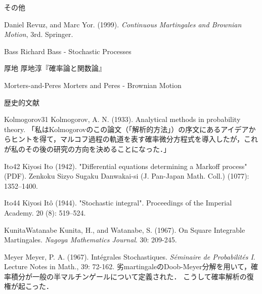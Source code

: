 \documentclass[uplatex,dvipdfmx]{jsreport}
\begin{document}
\begin{thebibliography}{99}
    その他
    \item
    Daniel Revuz, and Marc Yor. (1999). \textit{Continuous Martingales and Brownian Motion}, 3rd. Springer.
    \item{Bass}
    Richard Bass - Stochastic Processes
    \item{厚地}
    厚地淳『確率論と関数論』
    \item{Morters-and-Peres}
    Morters and Peres - Brownian Motion

    歴史的文献
    \item{Kolmogorov31}
    Kolmogorov, A. N. (1933). Analytical methods in probability theory.
    「私はKolmogorovのこの論文（「解析的方法」）の序文にあるアイデアからヒントを得て，マルコフ過程の軌道を表す確率微分方程式を導入したが，これが私のその後の研究の方向を決めることになった．」
    \item{Ito42}
    Kiyosi Ito (1942). "Differential equations determining a Markoff process" (PDF). Zenkoku Sizyo Sugaku Danwakai-si (J. Pan-Japan Math. Coll.) (1077): 1352–1400.
    \item{Ito44}
    Kiyosi Itô (1944). "Stochastic integral". Proceedings of the Imperial Academy. 20 (8): 519–524.
    \item{KunitaWatanabe}
    Kunita, H., and Watanabe, S. (1967). On Square Integrable Martingales. \textit{Nagoya Mathematics Journal}. 30: 209-245.
    \item{Meyer}
    Meyer, P. A. (1967). Intégrales Stochastiques. \textit{Séminaire de Probabilités I}. Lecture Notes in Math., 39: 72-162. 
    劣martingaleのDoob-Meyer分解を用いて，確率積分が一般の半マルチンゲールについて定義された．
    こうして確率解析の復権が起こった．
\end{thebibliography}
\end{document}
